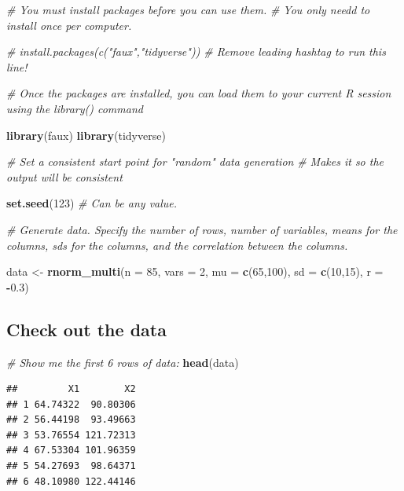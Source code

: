 \documentclass[
]{book}
\newenvironment{Shaded}{\begin{snugshade}}{\end{snugshade}}
\newcommand{\AttributeTok}[1]{\textcolor[rgb]{0.13,0.29,0.53}{#1}}
\newcommand{\CommentTok}[1]{\textcolor[rgb]{0.56,0.35,0.01}{\textit{#1}}}
\newcommand{\DecValTok}[1]{\textcolor[rgb]{0.00,0.00,0.81}{#1}}
\newcommand{\FloatTok}[1]{\textcolor[rgb]{0.00,0.00,0.81}{#1}}
\newcommand{\FunctionTok}[1]{\textcolor[rgb]{0.13,0.29,0.53}{\textbf{#1}}}
\newcommand{\NormalTok}[1]{#1}
\newcommand{\OtherTok}[1]{\textcolor[rgb]{0.56,0.35,0.01}{#1}}
\newcommand{\SpecialCharTok}[1]{\textcolor[rgb]{0.81,0.36,0.00}{\textbf{#1}}}
\begin{document}
\begin{Shaded}
\begin{Highlighting}[]
\CommentTok{\# You must install packages before you can use them.}
\CommentTok{\# You only needd to install once per computer. }

\CommentTok{\# install.packages(c("faux","tidyverse")) \# Remove leading hashtag to run this line! }


\CommentTok{\# Once the packages are installed, you can load them to your current R session using the library() command }

\FunctionTok{library}\NormalTok{(faux)}
\FunctionTok{library}\NormalTok{(tidyverse)}

\CommentTok{\# Set a consistent start point for "random" data generation}
\CommentTok{\# Makes it so the output will be consistent}

\FunctionTok{set.seed}\NormalTok{(}\DecValTok{123}\NormalTok{) }\CommentTok{\# Can be any value. }


\CommentTok{\# Generate data. Specify the number of rows, number of variables, means for the columns, sd\textquotesingle{}s for the columns, and the correlation between the columns.}

\NormalTok{data }\OtherTok{\textless{}{-}} \FunctionTok{rnorm\_multi}\NormalTok{(}\AttributeTok{n =} \DecValTok{85}\NormalTok{, }\AttributeTok{vars =} \DecValTok{2}\NormalTok{, }\AttributeTok{mu =} \FunctionTok{c}\NormalTok{(}\DecValTok{65}\NormalTok{,}\DecValTok{100}\NormalTok{), }\AttributeTok{sd =} \FunctionTok{c}\NormalTok{(}\DecValTok{10}\NormalTok{,}\DecValTok{15}\NormalTok{), }\AttributeTok{r =} \SpecialCharTok{{-}}\FloatTok{0.3}\NormalTok{)}
\end{Highlighting}
\end{Shaded}

\subsection*{Check out the data}\label{check-out-the-data}

\begin{Shaded}
\begin{Highlighting}[]
\CommentTok{\# Show me the first 6 rows of data: }
\FunctionTok{head}\NormalTok{(data)}
\end{Highlighting}
\end{Shaded}

\begin{verbatim}
##         X1        X2
## 1 64.74322  90.80306
## 2 56.44198  93.49663
## 3 53.76554 121.72313
## 4 67.53304 101.96359
## 5 54.27693  98.64371
## 6 48.10980 122.44146
\end{verbatim}
\end{document}
